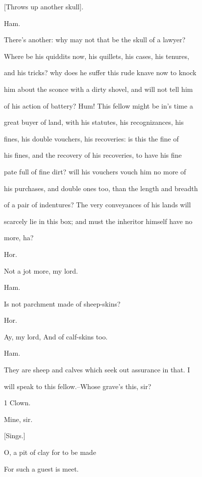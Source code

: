 \documentclass[12pt]{book}
\begin{document}
[Throws up another skull].



Ham.

There's another: why may not that be the skull of a lawyer?

Where be his quiddits now, his quillets, his cases, his tenures,

and his tricks? why does he suffer this rude knave now to knock

him about the sconce with a dirty shovel, and will not tell him

of his action of battery? Hum! This fellow might be in's time a

great buyer of land, with his statutes, his recognizances, his

fines, his double vouchers, his recoveries: is this the fine of

his fines, and the recovery of his recoveries, to have his fine

pate full of fine dirt? will his vouchers vouch him no more of

his purchases, and double ones too, than the length and breadth

of a pair of indentures? The very conveyances of his lands will

scarcely lie in this box; and must the inheritor himself have no

more, ha?



Hor.

Not a jot more, my lord.



Ham.

Is not parchment made of sheep-skins?



Hor.

Ay, my lord, And of calf-skins too.



Ham.

They are sheep and calves which seek out assurance in that. I

will speak to this fellow.--Whose grave's this, sir?



1 Clown.

Mine, sir.

[Sings.]

   O, a pit of clay for to be made

     For such a guest is meet.
\end{document}
